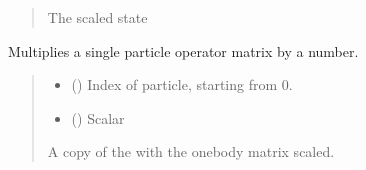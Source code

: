 \documentclass[letterpaper,10pt,english]{sphinxmanual}
\begin{document}
\begin{fulllineitems}
\begin{fulllineitems}
\begin{quote}
\begin{description}
\sphinxAtStartPar
The scaled state

\sphinxAtStartPar
{\hyperref[\detokenize{spinbox:spinbox.core.ProductOperator}]{}}

\end{description}\end{quote}

\end{fulllineitems}


\begin{fulllineitems}
\label{\detokenize{spinbox:spinbox.core.ProductOperator.scale_one}}
\pysigstartsignatures
{}
\pysigstopsignatures
\sphinxAtStartPar
Multiplies a single particle operator matrix by a number.
\begin{quote}\begin{description}
\begin{itemize}
\item {} 
\sphinxAtStartPar
{} () \textendash{} Index of particle, starting from 0.

\item {} 
\sphinxAtStartPar
{} () \textendash{} Scalar

\end{itemize}

\sphinxAtStartPar
A copy of the  with the one\sphinxhyphen{}body matrix scaled.

\sphinxAtStartPar
{\hyperref[\detokenize{spinbox:spinbox.core.ProductOperator}]{}}

\end{description}\end{quote}


\end{fulllineitems}
\end{fulllineitems}
\end{document}
